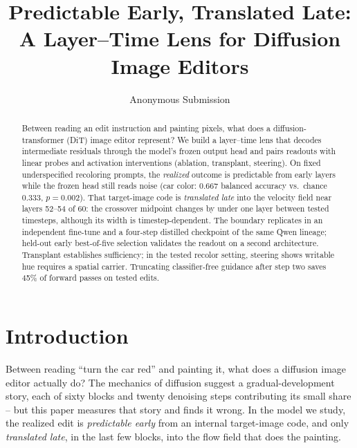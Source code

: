 \documentclass[letterpaper]{article} %
\title{Predictable Early, Translated Late: A Layer--Time Lens for Diffusion Image Editors}
\author{
    Anonymous Submission
}
\begin{document}
\maketitle

\begin{abstract}
Between reading an edit instruction and painting pixels, what does a
diffusion-transformer (DiT) image editor represent? We build a layer--time
lens that decodes intermediate residuals through the model's frozen output
head and pairs readouts with linear probes and activation interventions
(ablation, transplant, steering). On fixed underspecified recoloring
prompts, the \emph{realized} outcome is predictable from early layers
while the frozen head still reads noise (car color: $0.667$ balanced
accuracy vs.\ chance $0.333$, $p{=}0.002$). That target-image code is
\emph{translated late} into the velocity field near layers 52--54 of 60:
the crossover midpoint changes by under one layer between tested timesteps,
although its width is timestep-dependent. The boundary replicates in an
independent fine-tune and a four-step distilled checkpoint of the same
Qwen lineage; held-out early best-of-five selection validates the readout
on a second architecture. Transplant establishes sufficiency; in the tested
recolor setting, steering shows writable hue requires a spatial carrier. Truncating
classifier-free guidance after step two saves 45\% of forward passes on
tested edits.
\end{abstract}

\section{Introduction}\label{sec:intro}

Between reading ``turn the car red'' and painting it, what does a
diffusion image editor actually do? The mechanics of diffusion suggest
a gradual-development story, each of sixty blocks and twenty denoising
steps contributing its small share -- but this paper measures that
story and finds it wrong. In the model we study, the realized edit is
\emph{predictable early} from an internal target-image code, and only
\emph{translated late}, in the last few blocks, into the flow field that does
the painting.
\end{document}
